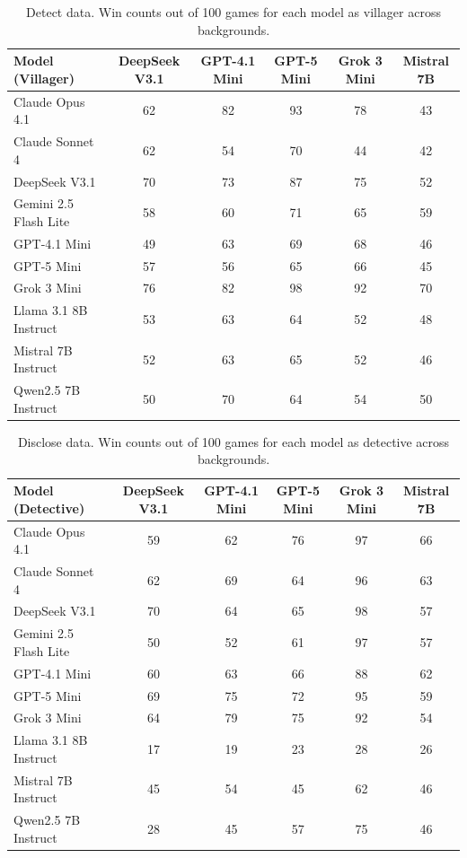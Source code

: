 \documentclass{article}
\begin{document}
\begin{table}[htbp]
\centering
\caption{Detect data. Win counts out of 100 games for each model as villager across backgrounds.}
\begin{tabular}{lccccc}
\toprule
\textbf{Model (Villager)} & \textbf{DeepSeek V3.1} & \textbf{GPT-4.1 Mini} & \textbf{GPT-5 Mini} & \textbf{Grok 3 Mini} & \textbf{Mistral 7B} \\
\midrule
Claude Opus 4.1 & 62 & 82 & 93 & 78 & 43 \\
Claude Sonnet 4 & 62 & 54 & 70 & 44 & 42 \\
DeepSeek V3.1 & 70 & 73 & 87 & 75 & 52 \\
Gemini 2.5 Flash Lite & 58 & 60 & 71 & 65 & 59 \\
GPT-4.1 Mini & 49 & 63 & 69 & 68 & 46 \\
GPT-5 Mini & 57 & 56 & 65 & 66 & 45 \\
Grok 3 Mini & 76 & 82 & 98 & 92 & 70 \\
Llama 3.1 8B Instruct & 53 & 63 & 64 & 52 & 48 \\
Mistral 7B Instruct & 52 & 63 & 65 & 52 & 46 \\
Qwen2.5 7B Instruct & 50 & 70 & 64 & 54 & 50 \\
\bottomrule
\end{tabular}
\label{tab:raw_detect_data}
\end{table}

\begin{table}[htbp]
\centering
\caption{Disclose data. Win counts out of 100 games for each model as detective across backgrounds.}
\begin{tabular}{lccccc}
\toprule
\textbf{Model (Detective)} & \textbf{DeepSeek V3.1} & \textbf{GPT-4.1 Mini} & \textbf{GPT-5 Mini} & \textbf{Grok 3 Mini} & \textbf{Mistral 7B} \\
\midrule
Claude Opus 4.1 & 59 & 62 & 76 & 97 & 66 \\
Claude Sonnet 4 & 62 & 69 & 64 & 96 & 63 \\
DeepSeek V3.1 & 70 & 64 & 65 & 98 & 57 \\
Gemini 2.5 Flash Lite & 50 & 52 & 61 & 97 & 57 \\
GPT-4.1 Mini & 60 & 63 & 66 & 88 & 62 \\
GPT-5 Mini & 69 & 75 & 72 & 95 & 59 \\
Grok 3 Mini & 64 & 79 & 75 & 92 & 54 \\
Llama 3.1 8B Instruct & 17 & 19 & 23 & 28 & 26 \\
Mistral 7B Instruct & 45 & 54 & 45 & 62 & 46 \\
Qwen2.5 7B Instruct & 28 & 45 & 57 & 75 & 46 \\
\bottomrule
\end{tabular}
\label{tab:raw_disclose_data}
\end{table}
\end{document}
